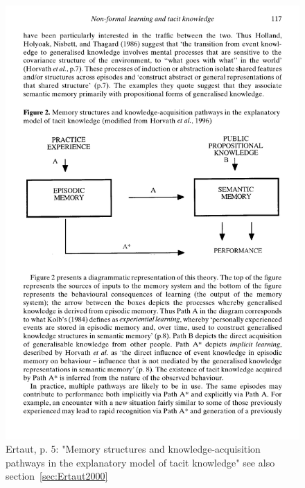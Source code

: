 \documentclass[12pt,a4paper]{article}
\begin{document}
    \begin{figure}[htb]
      \centering
      \includegraphics[width=12cm]{Meeting 4 NON-FORMAL LEARNING - Seite 5.pdf}
      \caption{Ertaut, p. 5: "Memory structures and knowledge-acquisition pathways in the explanatory model of tacit knowledge" see also section~\ref{sec:Ertaut2000}}
      \label{fig:Ertaut tacitknowledgemodel}
    \end{figure}
\end{document}
